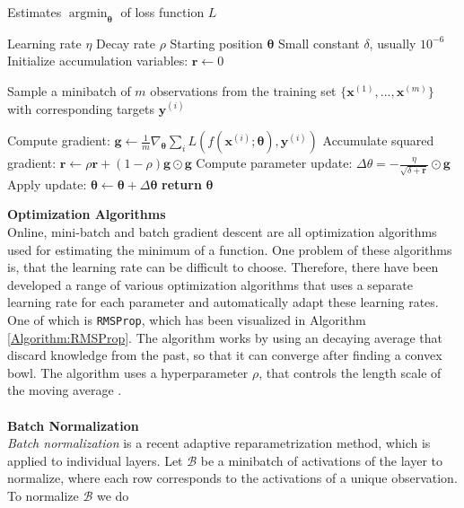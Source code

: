 \documentclass[main.tex]{subfiles}
\begin{document}
\begin{algorithm}[h]
    \caption{Estimates $\operatorname*{argmin}_{\bm{\theta}}$ of loss function $L$ \cite{DeepLearning}}
    \label{Algorithm:RMSProp}
    \begin{algorithmic}[1]
        \Require Learning rate $\eta$
        \Require Decay rate $\rho$
        \Require Starting position $\bm{\theta}$
        \Require Small constant $\delta$, usually $10^{-6}$
        \State Initialize accumulation variables: $\bm{r} \gets 0$
            \State \begin{varwidth}[t]{\linewidth}
            Sample a minibatch of $m$ observations from the training set $\{\bm{x}^{(1)}, ..., \bm{x}^{(m)}\}$ with corresponding targets $\bm{y}^{(i)}$
            \end{varwidth}
            \State Compute gradient: $\bm{g} \gets \frac{1}{m} \nabla_{\bm{\theta}} \sum_i L(f(\bm{x}^{(i)}; \bm{\theta}), \bm{y}^{(i)})$
            \State Accumulate squared gradient: $\bm{r} \gets \rho \bm{r} + (1 - \rho) \bm{g} \odot \bm{g}$
            \State Compute parameter update: $\Delta\theta = - \frac{\eta}{\sqrt{\delta + \bm{r}}} \odot \bm{g}$
            \State Apply update: $\bm{\theta} \gets \bm{\theta} + \Delta \bm{\theta}$ 
        \EndWhile
        \State \textbf{return} $\bm{\theta}$
        \EndProcedure
    \end{algorithmic}
\end{algorithm}
\noindent \textbf{Optimization Algorithms} \\
\noindent Online, mini-batch and batch gradient descent are all optimization algorithms used for estimating the minimum of a function. One problem of these algorithms is, that the learning rate can be difficult to choose. Therefore, there have been developed a range of various optimization algorithms that uses a separate learning rate for each parameter and automatically adapt these learning rates. One of which is \texttt{RMSProp}, which has been visualized in Algorithm \ref{Algorithm:RMSProp}. The algorithm works by using an decaying average that discard knowledge from the past, so that it can converge after finding a convex bowl. The algorithm uses a hyperparameter $\rho$, that controls the length scale of the moving average \cite{DeepLearning}.
\\
\\
\textbf{Batch Normalization} \\
\textit{Batch normalization} is a recent adaptive reparametrization method, which is applied to individual layers. Let $\bm{\mathcal{B}}$ be a minibatch of activations of the layer to normalize, where each row corresponds to the activations of a unique observation. To normalize $\bm{\mathcal{B}}$ we do
\end{document}
